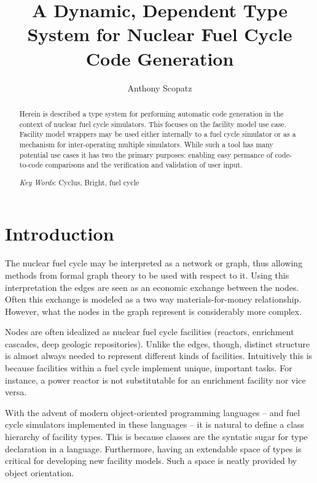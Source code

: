 \documentclass{ansconfpaper}
\begin{document}
\lstset{language=Python}

\title{A Dynamic, Dependent Type System for Nuclear Fuel Cycle Code Generation}

\author{Anthony Scopatz}

\maketitle

\begin{abstract}
Herein is described a type system for performing automatic code generation
in the context of nuclear fuel cycle simulators.  This focuses on the 
facility model use case.  Facility model wrappers may be used either internally
to a fuel cycle simulator or as a mechanism for inter-operating multiple simulators.
While such a tool has many potential use cases it has two the primary purposes:
enabling easy permance of code-to-code comparisons and the verification and 
validation of user input.

\emph{Key Words}: Cyclus, Bright, fuel cycle
\end{abstract}


\section{Introduction}
\label{sec:intro}
The nuclear fuel cycle may be interpreted as a network or graph, thus 
allowing methods from formal graph theory \cite{DIE05B} to be used with 
respect to it.  Using this interpretation the edges are seen as an economic exchange 
between the nodes.  Often this exchange is modeled as a two way materials-for-money 
relationship.  However, what the nodes in the graph represent is considerably 
more complex.  

Nodes are often idealized as nuclear fuel cycle facilities (reactors, enrichment
cascades, deep geologic repositories).  Unlike the edges, though, distinct structure
is almost always needed to represent different kinds of facilities.  Intuitively 
this is because facilities within a fuel cycle implement unique, important 
tasks.  For instance, a power reactor is not substitutable for an enrichment facility
nor vice versa.  

With the advent of modern object-oriented programming languages -- and fuel cycle
simulators implemented in these languages -- it is natural to define a class 
hierarchy of facility types.  This is because classes are the syntatic sugar for type 
declaration in a language.  Furthermore, having an extendable space of types is 
critical for developing new facility models.  Such a space is neatly provided by 
object orientation.
\end{document}
